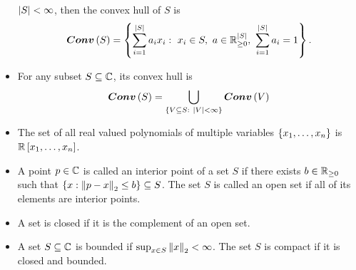 \begin{itemize}
  $\left|S\right|<\infty$, then the convex hull of $S$ is
%
  \[
\bm{Conv}\left(S\right)=\left\{\sum_{i=1}^{\left|S\right|}a_ix_i:~x_i\in
  S,~a\in\mathbb{R}^{\left|S\right|}_{\geq 0},~\sum_{i=1}^{\left|S\right|}a_i=1\right\}.
  \]
\item For any subset $S\subseteq\mathbb{C}$, its convex hull is
%
  \[
\bm{Conv}\left(S\right)=\bigcup_{\left\{V\subseteq S:~\left|V\right|<\infty\right\}}\bm{Conv}\left(V\right)
  \]
\item The set of all real valued polynomials of multiple variables
  $\left\{x_1,\ldots,x_n\right\}$ is $\mathbb{R}\left[x_1,\ldots,x_n\right]$.
\item A point $p\in\mathbb{C}$ is called an interior point of a set $S$
  if there exists $b\in\mathbb{R}_{\geq 0}$ such that
  $\left\{x:\left\|p-x\right\|_{2}\leq b\right\}\subseteq S$.  The set $S$ is called an
  open set if all of its elements are interior points.
\item A set is closed if it is the complement of an open set.
\item A set $S\subseteq\mathbb{C}$ is bounded if $\sup_{x\in
  S}\left\|x\right\|_2< \infty$.  The set $S$ is compact if it is closed and
  bounded.
\end{itemize}


